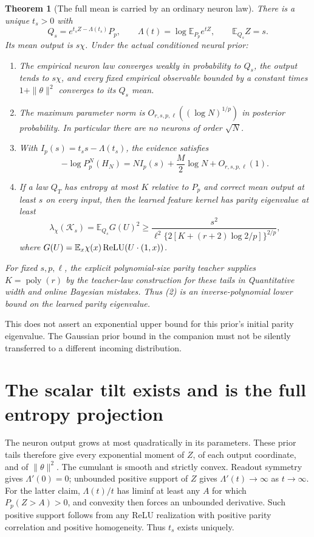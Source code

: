 \documentclass[11pt]{article}
\newtheorem{theorem}{Theorem}\newtheorem{lemma}[theorem]{Lemma}
\newcommand{\E}{\mathbb E}\newcommand{\Pp}{\mathbb P}
\begin{document}
\begin{theorem}[The full mean is carried by an ordinary neuron law]
There is a unique $t_s>0$ with
\[
 Q_s=e^{t_sZ-\Lambda(t_s)}P_p,\qquad
 \Lambda(t)=\log\E_{P_p}e^{tZ},\qquad \E_{Q_s}Z=s.
\]
Its mean output is $s\chi$. Under the actual conditioned neural prior:
\begin{enumerate}
\item The empirical neuron law converges weakly in probability to $Q_s$,
      the output tends to $s\chi$, and every fixed empirical observable
      bounded by a constant times $1+\|\theta\|^2$ converges to its $Q_s$ mean.
\item The maximum parameter norm is
      $O_{r,s,p,\ell}((\log N)^{1/p})$ in posterior probability. In
      particular there are no neurons of order $\sqrt N$.
\item With $I_p(s)=t_ss-\Lambda(t_s)$, the evidence satisfies
\[
 -\log P_p^N(H_N)=NI_p(s)+\frac M2\log N+O_{r,s,p,\ell}(1).  \tag{1}
\]
\item If a law $Q_T$ has entropy at most $K$ relative to $P_p$ and
      correct mean output at least $s$ on every input, then the learned
      feature kernel has parity eigenvalue at least
\[
 \lambda_\chi(\mathcal K_s)=\E_{Q_s}G(U)^2
 \ge\frac{s^2}{\ell^2\{2[K+(r+2)\log2/p]\}^{2/p}},          \tag{2}
\]
      where $G(U)=\E_x\chi(x)\relu(U\cdot(1,x))$.
\end{enumerate}
For fixed $s,p,\ell$, the explicit polynomial-size parity teacher supplies
$K=\operatorname{poly}(r)$ by the teacher-law construction for these tails in
\emph{Quantitative width and online Bayesian mistakes}. Thus (2) is an
inverse-polynomial lower bound on the learned parity eigenvalue.
\end{theorem}
This does not assert an exponential upper bound for this prior's
initial parity eigenvalue. The Gaussian prior bound in the companion
must not be silently transferred to a different incoming distribution.

\section{The scalar tilt exists and is the full entropy projection}
The neuron output grows at most quadratically in its parameters. These
prior tails therefore give every exponential moment of $Z$, of each
output coordinate, and of $\|\theta\|^2$. The cumulant is smooth and
strictly convex. Readout symmetry gives $\Lambda'(0)=0$; unbounded
positive support of $Z$ gives $\Lambda'(t)\to\infty$ as $t\to\infty$.
For the latter claim, $\Lambda(t)/t$ has liminf at least any $A$ for
which $P_p(Z>A)>0$, and convexity then forces an unbounded derivative.
Such positive support follows from any ReLU realization with positive
parity correlation and positive homogeneity. Thus $t_s$ exists uniquely.
\end{document}
